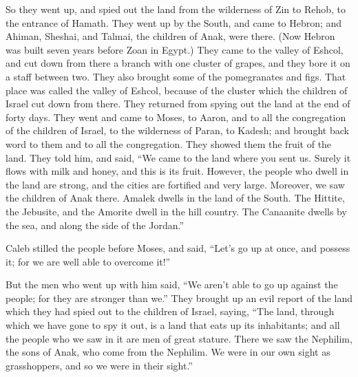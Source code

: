 {\par }{\PP {}So they went up, and spied out the land from the wilderness of Zin to Rehob, to the entrance of Hamath.
They went up by the South, and came to Hebron; and Ahiman, Sheshai, and Talmai, the children of Anak, were there. (Now Hebron was built seven years before Zoan in Egypt.)
They came to the valley of Eshcol, and cut down from there a branch with one cluster of grapes, and they bore it on a staff between two. They also brought some of the pomegranates and figs.
That place was called the valley of Eshcol, because of the cluster which the children of Israel cut down from there.
They returned from spying out the land at the end of forty days.
They went and came to Moses, to Aaron, and to all the congregation of the children of Israel, to the wilderness of Paran, to Kadesh; and brought back word to them and to all the congregation. They showed them the fruit of the land.
They told him, and said, “We came to the land where you sent us. Surely it flows with milk and honey, and this is its fruit.
However, the people who dwell in the land are strong, and the cities are fortified and very large. Moreover, we saw the children of Anak there.
Amalek dwells in the land of the South. The Hittite, the Jebusite, and the Amorite dwell in the hill country. The Canaanite dwells by the sea, and along the side of the Jordan.”
\par }{\PP {}Caleb stilled the people before Moses, and said, “Let’s go up at once, and possess it; for we are well able to overcome it!”
\par }{\PP {}But the men who went up with him said, “We aren’t able to go up against the people; for they are stronger than we.”
They brought up an evil report of the land which they had spied out to the children of Israel, saying, “The land, through which we have gone to spy it out, is a land that eats up its inhabitants; and all the people who we saw in it are men of great stature.
There we saw the Nephilim, the sons of Anak, who come from the Nephilim. We were in our own sight as grasshoppers, and so we were in their sight.”

}
